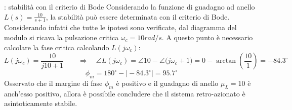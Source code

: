 		\begin{esempio}{: stabilità con il criterio di Bode}
			Considerando la funzione di guadagno ad anello $L(s) = \frac{10}{s+1}$, la stabilità può essere determinata con il criterio di Bode. Considerando infatti che tutte le  ipotesi sono verificate, dal diagramma del modulo si ricava la pulsazione critica $\omega_c = 10 rad/s$. A questo punto è necessario calcolare la fase critica calcolando $L(j\omega_c)$:
			\[L(j\omega_c) = \frac{10}{j10 + 1} \qquad \Rightarrow\quad \angle L(j\omega_c) = \angle 10 - \angle \big(j\omega_c + 1\big)=0 - \arctan\left( \frac{10}{1} \right) = -84.3^\circ  \]
			\[  \phi_m = 180^\circ - \big|-84.3^\circ \big| = 95.7^\circ \]
			Osservato che il margine di fase $\phi_m$ è positivo  e il guadagno di anello $\mu_L= 10$ è anch'esso positivo, allora è possibile concludere che il sistema retro-azionato è asintoticamente stabile.
		\end{esempio}